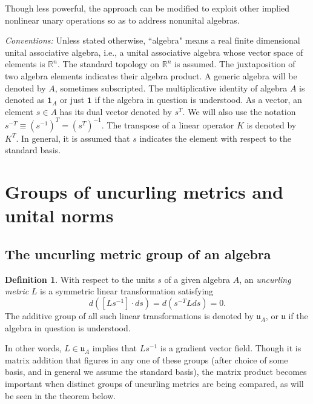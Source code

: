 \documentclass{amsart}
\numberwithin{equation}{section}
\theoremstyle{definition}
\newtheorem{definition}[theorem]{Definition}
\numberwithin{theorem}{section}
\begin{document}
  Though less powerful, the approach can be modified to exploit other implied nonlinear unary operations so as to address nonunital algebras.
  
  \bigskip
  
 {\it Conventions:}   Unless stated otherwise, ``algebra" means a real finite dimensional unital associative algebra, i.e., a unital associative algebra whose vector space of elements is $\mathbb{R}^n$. The standard topology on $\mathbb{R}^n$ is assumed.  The juxtaposition of two algebra elements indicates their algebra product.   A generic algebra will be denoted by $A$, sometimes subscripted. The multiplicative identity of algebra $A$ is denoted as $\mathbf{1}_A$ or just $\mathbf{1}$ if the algebra in question is understood.    As a vector, an element $s\in A$ has its dual vector denoted by $s^T$.  We will also use the notation $s^{-T} \equiv (s^{-1})^T = (s^T)^{-1}$.  The transpose of a linear operator $K$ is denoted by $K^T$.          
  In general, it is assumed that $s$ indicates the element with respect to the standard basis.

 \section{Groups of uncurling metrics and unital norms}
   
   \subsection{The uncurling metric group of an algebra}
     
  \begin{definition}\label{7/21/23.1} With respect to the units $s$ of a given algebra $A$, an {\it uncurling metric} $L$ is a symmetric linear transformation  satisfying \begin{equation}\label{4/7/23.1} d([Ls^{-1}]\cdot ds) = d\left(s^{-T} L ds\right) = 0. \end{equation}  The additive group of all such linear transformations is denoted by $\mathfrak{u}_A$, or $\mathfrak{u}$ if the algebra in question is understood. \end{definition}
   
   In other words, $L\in \mathfrak{u}_A$ implies that $Ls^{-1}$ is a gradient vector field.  Though it is matrix addition that figures in any one of these groups (after choice of some basis, and in general we assume the standard basis), the matrix product becomes important when distinct groups of uncurling metrics are being compared, as will be seen in the theorem below.
   
\end{document}
